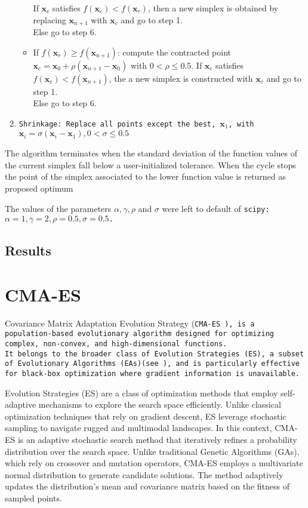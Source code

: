 \begin{enumerate}
\begin{itemize}
                If $\mathbf{x}_c$ satisfies $f(\mathbf{x}_c) < f(\mathbf{x}_{r})$, then a new simplex is obtained by replacing $\mathbf{x}_{n+1}$ with  $\mathbf{x}_c$ and go to step 1.\\
                Else go to step 6.
        \item  If $f(\mathbf{x}_r) \geq f(\mathbf{x}_{n+1})$: compute the contracted point $\mathbf{x}_c=\mathbf{x}_0 +\rho(\mathbf{x}_{n+1}-\mathbf{x}_0)$ with $0<\rho \leq 0.5$.
                If $\mathbf{x}_c$ satisfies $f(\mathbf{x}_c) < f(\mathbf{x}_{n+1})$, the a new simplex is constructed with $\mathbf{x}_c$ and go to step 1.\\
                Else go to step 6.
    \end{itemize}
    \item \tt{Shrinkage}: Replace all points except the best, $\mathbf{x}_1$, with $\mathbf{x}_i = \sigma(\mathbf{x}_i - \mathbf{x}_1), 0<\sigma \leq 0.5$  
\end{enumerate}
The algorithm terminates when the standard deviation of the function values of the current simplex fall below a user-initialized tolerance. 
When the cycle stops the point of the simplex associated to the lower function value is returned as proposed optimum

The values of the parameters $\alpha, \gamma, \rho$ and $\sigma$ were left to default of \tt{scipy}: $\alpha=1, \gamma=2, \rho=0.5, \sigma=0.5$. 
\subsection{Results}

\section{CMA-ES}
Covariance Matrix Adaptation Evolution Strategy (\tt{CMA-ES} \cite{cmaessimplepractical}), is a population-based evolutionary algorithm designed for optimizing complex, non-convex, and high-dimensional functions.\\
It belongs to the broader class of Evolution Strategies (ES), a subset of Evolutionary Algorithms (EAs)(see \cite{sloss20192019evolutionaryalgorithmsreview}), and is particularly effective for black-box optimization where gradient information is unavailable.

Evolution Strategies (ES) are a class of optimization methods that employ self-adaptive mechanisms to explore the search space efficiently. 
Unlike classical optimization techniques that rely on gradient descent, ES leverage stochastic sampling to navigate rugged and multimodal landscapes.
In this context, CMA-ES is an adaptive stochastic search method that iteratively refines a probability distribution over the search space. 
Unlike traditional Genetic Algorithms (GAs), which rely on crossover and mutation operators, CMA-ES employs a multivariate normal distribution to generate candidate solutions. 
The method adaptively updates the distribution's mean and covariance matrix based on the fitness of sampled points.

